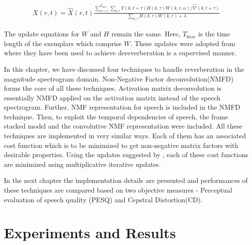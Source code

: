 \documentclass[12pt, a4paper, oneside]{book}
\begin{document}
\begin{align}X(r,t) = \hat{X}(r,t)\frac{\sum_{\alpha = 1}^{T_{base}}\sum_{k,\tau}Y(k,t + \tau)H(k,\tau)W(k,r,\alpha)/\hat{Y'}(k,t + \tau)}{\sum_{k,\tau}H(k,\tau)W(k,r) + \lambda}
\end{align}

The update equations for $W$ and $H$ remain the same. Here, $T_{base}$ is the time length of the exemplars which comprise $W$.  These updates were adopted from \cite{baby} where they have been used to achieve dereverberation is a supervised manner. 

In this chapter, we have discussed four techniques to handle reverberation in the magnitude spectrogram domain. Non-Negative Factor deconvolution(NMFD) forms the core of all these techniques. Activation matrix deconvolution is essentially NMFD applied on the activation matrix instead of the speech spectrogram. Further, NMF representation for speech is included in the NMFD technique. Then, to exploit the temporal dependencies of speech, the frame stacked model and the convolutive NMF representation  were included. All these techniques are implemented in very similar ways. Each of them has an associated cost function which is to be minimized to get non-negative matrix factors with desirable properties. Using the updates suggested by \cite{lee}, each of these cost functions are minimized using multiplicative iterative updates.

In the next chapter the implementation details are presented and performances  of these techniques are compared based on two objective measures - Perceptual evaluation of speech quality (PESQ) and Cepstral Distortion(CD).























\chapter{Experiments and Results}
\end{document}

